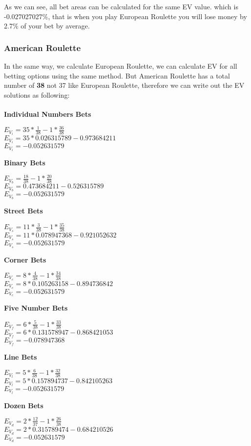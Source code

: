 \documentclass{article}
\begin{document}
As we can see, all bet areas can be calculated for the same EV value.  which is -0.027027027\%, that is when you play European Roulette you will lose money by 2.7\% of your bet by average.

\subsubsection{American Roulette}
In the same way, we calculate European Roulette, we can calculate EV for all betting options using the same method.  But American Roulette has a total number of \textbf{38} not 37 like European Roulette, therefore we can write out the EV solutions as following:\\
\\
\textbf{Individual Numbers Bets}
\begin{center}
$E_{V_i}=35 * \frac{1}{38} - 1 * \frac{36}{38}$\\
$E_{V_i}=35*0.026315789 - 0.973684211$\\
$E_{V_i}=-0.052631579$\\
\end{center}   
\textbf{Binary Bets}
\begin{center}
$E_{V_b}=\frac{18}{38} - 1 * \frac{20}{38}$\\
$E_{V_b}=0.473684211 - 0.526315789$\\
$E_{V_b}=-0.052631579$\\
\end{center} 
\textbf{Street Bets}
\begin{center}
$E_{V_s}=11 * \frac{3}{38} - 1 * \frac{35}{38}$\\
$E_{V_s}=11*0.078947368 -0.921052632$\\
$E_{V_s}=-0.052631579$\\
\end{center}  
\textbf{Corner Bets}
\begin{center}
$E_{V_c}=8 * \frac{4}{38} - 1 * \frac{34}{38}$\\
$E_{V_c}=8*0.105263158 - 0.894736842$\\
$E_{V_c}=-0.052631579$\\
\end{center} 
\textbf{Five Number Bets}
\begin{center}
$E_{V_f}=6 * \frac{5}{38} - 1 * \frac{33}{38}$\\
$E_{V_f}=6*0.131578947 - 0.868421053$\\
$E_{V_f}=-0.078947368$\\
\end{center}  
\textbf{Line Bets}
\begin{center}
$E_{V_l}=5 * \frac{6}{38} - 1 * \frac{32}{38}$\\
$E_{V_l}=5*0.157894737-0.842105263$\\
$E_{V_l}=-0.052631579$\\
\end{center}  
\textbf{Dozen Bets}
\begin{center}
$E_{V_d}=2 * \frac{12}{37} - 1 * \frac{26}{38}$\\
$E_{V_d}=2*0.315789474 - 0.684210526$\\
$E_{V_d}=-0.052631579$\\
\end{center}  
\end{document}
